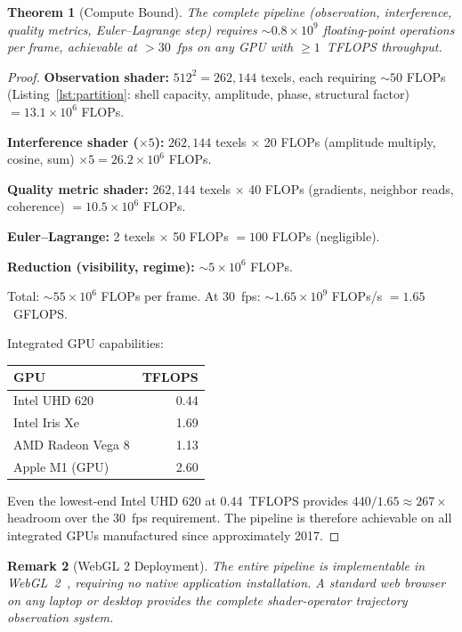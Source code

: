 \documentclass[11pt,twocolumn,a4paper]{article}
\newtheorem{theorem}{Theorem}[section]
\newtheorem{remark}[theorem]{Remark}
\begin{document}
\begin{theorem}[Compute Bound]
\label{thm:compute}
The complete pipeline (observation, interference, quality metrics, Euler--Lagrange step) requires $\sim\!0.8 \times 10^9$ floating-point operations per frame, achievable at $>30$~fps on any GPU with $\geq 1$~TFLOPS throughput.
\end{theorem}

\begin{proof}
\textbf{Observation shader:} $512^2 = 262{,}144$ texels, each requiring $\sim\!50$ FLOPs (Listing~\ref{lst:partition}: shell capacity, amplitude, phase, structural factor) $= 13.1 \times 10^6$ FLOPs.

\textbf{Interference shader ($\times 5$):} $262{,}144$ texels $\times$ 20 FLOPs (amplitude multiply, cosine, sum) $\times 5 = 26.2 \times 10^6$ FLOPs.

\textbf{Quality metric shader:} $262{,}144$ texels $\times$ 40 FLOPs (gradients, neighbor reads, coherence) $= 10.5 \times 10^6$ FLOPs.

\textbf{Euler--Lagrange:} 2 texels $\times$ 50 FLOPs $= 100$ FLOPs (negligible).

\textbf{Reduction (visibility, regime):} $\sim\!5 \times 10^6$ FLOPs.

Total: $\sim\!55 \times 10^6$ FLOPs per frame.
At 30~fps: $\sim\!1.65 \times 10^9$ FLOPs/s $= 1.65$~GFLOPS.

Integrated GPU capabilities:
\begin{center}
\begin{tabular}{lr}
\toprule
GPU & TFLOPS \\
\midrule
Intel UHD 620 & 0.44 \\
Intel Iris Xe & 1.69 \\
AMD Radeon Vega 8 & 1.13 \\
Apple M1 (GPU) & 2.60 \\
\bottomrule
\end{tabular}
\end{center}

Even the lowest-end Intel UHD 620 at 0.44~TFLOPS provides $440/1.65 \approx 267\times$ headroom over the 30~fps requirement.
The pipeline is therefore achievable on all integrated GPUs manufactured since approximately 2017.
\end{proof}

\begin{remark}[WebGL 2 Deployment]
The entire pipeline is implementable in WebGL~2~\cite{khronos2023webgl2}, requiring no native application installation.
A standard web browser on any laptop or desktop provides the complete shader-operator trajectory observation system.
\end{remark}
\end{document}
